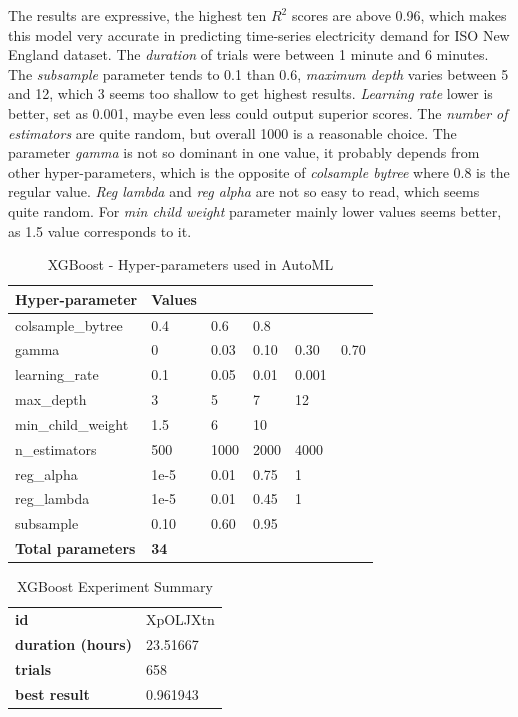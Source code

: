 The results are expressive, the highest ten $R^2$ scores are above 0.96, which makes this model very accurate in predicting time-series electricity demand for ISO New England dataset. The \textit{duration} of trials were between 1 minute and 6 minutes. The \textit{subsample} parameter tends to 0.1 than 0.6, \textit{maximum depth} varies between 5 and 12, which 3 seems too shallow to get highest results. \textit{Learning rate} lower is better, set as 0.001, maybe even less could output superior scores. The \textit{number of estimators} are quite random, but overall 1000 is a reasonable choice. The parameter \textit{gamma} is not so dominant in one value, it probably depends from other hyper-parameters, which is the opposite of \textit{colsample bytree} where 0.8 is the regular value. \textit{Reg lambda} and \textit{reg alpha} are not so easy to read, which seems quite random. For \textit{min child weight} parameter mainly lower values seems better, as 1.5 value corresponds to it. 




\begin{table}[!htpb]
\small
\centering
\caption{XGBoost - Hyper-parameters used in AutoML}
\label{tab:XGBoostParams}
\begin{tabular}{llllll} \hline
\textbf{Hyper-parameter} & \textbf{Values} & \textbf{} & \textbf{} & \textbf{} & \textbf{} \\ \hline
colsample\_bytree & 0.4 & 0.6 & 0.8 &  &  \\
gamma & 0 & 0.03 & 0.10 & 0.30 & 0.70 \\
learning\_rate & 0.1 & 0.05 & 0.01 & 0.001 &  \\
max\_depth & 3 & 5 & 7 & 12 &  \\
min\_child\_weight & 1.5 & 6 & 10 &  &  \\
n\_estimators & 500 & 1000 & 2000 & 4000 &  \\
reg\_alpha & 1e-5 & 0.01 & 0.75 & 1 &  \\
reg\_lambda & 1e-5 & 0.01 & 0.45 & 1 &  \\
subsample & 0.10 & 0.60 & 0.95 &  &  \\ \hline
\textbf{Total parameters} & \textbf{34} &  &  &  & \\ \hline
\end{tabular}
\end{table}


\begin{table}[!htpb]
\small
\centering
\caption{XGBoost Experiment Summary}
\label{tab:XGBoostResults3}
\begin{tabular}{ll} \hline
\textbf{id} & XpOLJXtn \\
\textbf{duration (hours)} & 23.51667 \\
\textbf{trials} & 658 \\
\textbf{best result} & 0.961943 \\ \hline
\end{tabular}
\end{table}


